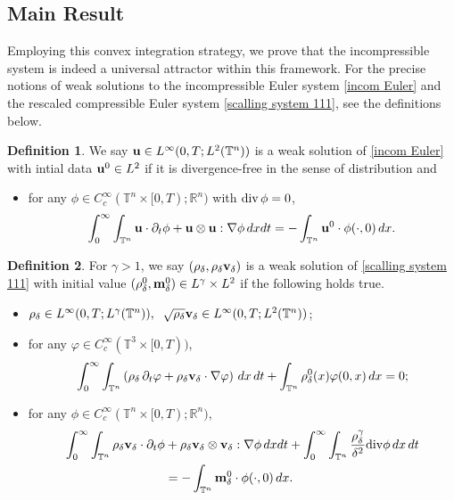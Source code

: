 \documentclass[12pt,reqno]{amsart}
\theoremstyle{definition}
\newtheorem{Definition}{Definition}[section]
\theoremstyle{remark}
\numberwithin{equation}{section}
\renewcommand{\u}{{\bf u}}
\newcommand{\R}{{\mathbb R}}
\newcommand{\Dv}{{\rm div}}
\renewcommand{\v}{{\bf v}}
\newcommand{\m}{{\bf m}}
\begin{document}
\subsection*{Main Result}
Employing this convex integration strategy, we prove that the incompressible system is indeed a universal attractor within this framework. For the precise notions of weak solutions to the incompressible Euler system \eqref{incom Euler} and the rescaled compressible Euler system \eqref{scalling system 111}, see the definitions below.
\begin{Definition}
\label{definition of weak solution incom}
We say $\u \in L^{\infty}(0,T;L^2(\mathbb{T}^n)) $ is a weak solution of \eqref{incom Euler} with intial data $\u^0 \in L^2$ if it is divergence-free in the sense of distribution and 
\begin{itemize}
\item for any $\phi \in C^\infty_c(\mathbb{T}^n \times [0, T); \R^n)$ with $\Dv \, \phi = 0$,
\begin{equation}\label{weak incomp euler eqn}
\int^\infty_0 \int_{\mathbb{T}^n} \u \cdot \partial_t \phi + \u \otimes \u : \nabla \phi  \,dxdt =  -\int_{\mathbb{T}^n} \u^0 \cdot \phi(\cdot, 0) \,dx.
\end{equation}
\end{itemize}
\end{Definition}

\begin{Definition}
\label{definition of weak solutions compressible} 
For $\gamma>1$, we say $(\rho_{\delta}, \rho_{\delta} \v_{\delta})$ is a weak solution of \eqref{scalling system 111} with initial value $(\rho^0_{\delta},\m_{\delta}^0) \in L^\gamma \times L^2$ if the following holds true.
\begin{itemize}
\item $\rho_{\delta}\in L^{\infty}(0,T;L^{\gamma}(\mathbb{T}^n)), \;\;\sqrt{\rho_{\delta}} \v_{\delta}\in L^{\infty}(0,T;L^2(\mathbb{T}^n))$;
\item  for any $\varphi \in C^\infty_c(\mathbb{T}^3 \times [0, T))$,
\[
\int_0^\infty \int_{\mathbb{T}^n} \left( \rho_{\delta} \, \partial_t \varphi + \rho_{\delta} \v_{\delta} \cdot \nabla \varphi \right) \, dx \, dt + \int_{\mathbb{T}^n} \rho_{\delta}^0(x) \varphi(0,x) \, dx = 0;
\]
 
 \item for any $\phi \in C^\infty_c(\mathbb{T}^n \times [0, T); \R^n)$,
\begin{equation*}
\begin{split}
\int^\infty_0 \int_{\mathbb{T}^n} \rho_{\delta} \v_{\delta} \cdot \partial_t \phi &+ \rho_{\delta} \v_{\delta} \otimes \v_{\delta} : \nabla \phi  \,dxdt +\int_0^\infty\int_{\mathbb{T}^n}\frac{\rho_{\delta}^{\gamma}}{\delta^2}\Dv \phi\,dx\,dt
\\&=  -\int_{\mathbb{T}^n}\m_{\delta}^0 \cdot \phi(\cdot, 0) \,dx.
\end{split}
\end{equation*}
\end{itemize}
\end{Definition}
\end{document}

